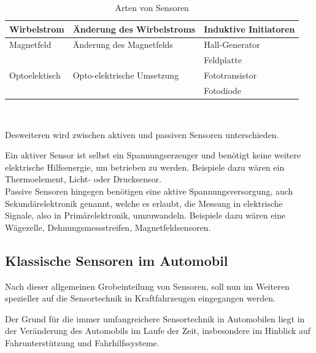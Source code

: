 \begin{flushleft}
\begin{table}[h]
\begin{tabularx}{\textwidth}{l|l|l}
	                    Wirbelstrom & Änderung des Wirbelstroms & Induktive Initiatoren\\
	                    \hline
	                    
	                    Magnetfeld & Änderung des Magnetfelds & Hall-Generator\\
	                    && Feldplatte\\
	                    \hline
	
	                    Optoelektisch & Opto-elektrische Umsetzung & Fototransistor\\
	                    && Fotodiode\\
	                    
	
	                \end{tabularx}\\
	                \caption{Arten von Sensoren}
	                \label{fig:TS09}
	            \end{table}
	         	
	                	Desweiteren wird zwischen aktiven und passiven Sensoren unterschieden. 
	                	
	                	Ein aktiver Sensor ist selbst ein Spannungserzeuger und benötigt keine weitere elektrische Hilfsenergie, um betrieben zu werden. Beispiele dazu wären ein Thermoelement, Licht- oder Drucksensor.\\
	                	
	                	Passive Sensoren hingegen benötigen eine aktive Spannungsversorgung, auch Sekundärelektronik genannt, welche es erlaubt, die Messung in elektrische Signale, also in Primärelektronik, umzuwandeln. Beispiele dazu wären eine Wägezelle, Dehnungsmessstreifen, Magnetfeldsensoren.		
	                	
	                                        
	\subsection{Klassische Sensoren im Automobil} 
	       
	    Nach dieser allgemeinen Grobeinteilung von Sensoren, soll nun im Weiteren spezieller auf die Sensortechnik in Kraftfahrzeugen eingegangen werden.
	
	    Der Grund für die immer umfangreichere Sensortechnik in Automobilen liegt in der Veränderung des Automobils im Laufe der Zeit, insbesondere im Hinblick auf Fahrunterstützung und Fahrhilfssysteme.
	     	

\end{flushleft}

